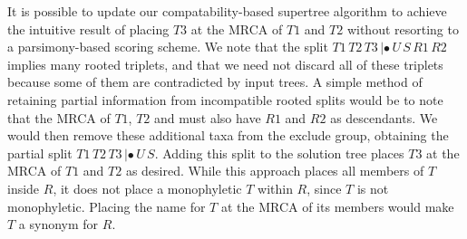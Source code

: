 \documentclass[english]{article}
\begin{document}
It is possible to update our compatability-based supertree algorithm
to achieve the intuitive result of placing $T3$ at the MRCA of $T1$
and $T2$ without resorting to a parsimony-based scoring scheme. We
note that the split $T1\,T2\,T3\,|\bullet\,U\,S\,R1\,R2$ implies
many rooted triplets, and that we need not discard all of these
triplets because some of them are contradicted by input trees.  A
simple method of retaining partial information from incompatible
rooted splits would be to note that the MRCA of $T1$, $T2$ and must
also have $R1$ and $R2$ as descendants.  We would then remove these
additional taxa from the exclude group, obtaining the partial split
$T1\,T2\,T3\,|\bullet\,U\,S$.  Adding this split to the solution
tree places $T3$ at the MRCA of $T1$ and $T2$ as desired.  While this
approach places all members of $T$ inside $R$, it does not
place a monophyletic $T$ within $R$, since $T$ is not monophyletic.
Placing the name for $T$ at the MRCA of its members would make $T$ a
synonym for $R$.


\end{document}
